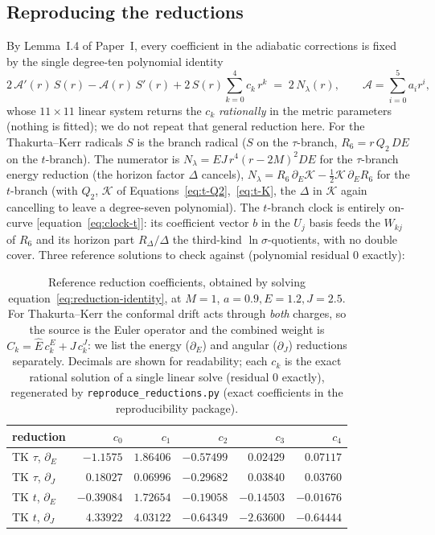 \documentclass[12pt]{iopart}
\theoremstyle{plain}
\theoremstyle{definition}
\theoremstyle{remark}
\newcommand{\Ehat}{\hat E}
\begin{document}
\subsection{Reproducing the reductions}
\label{app:reproduce}
By Lemma~I.4 of Paper~I, every coefficient in the adiabatic corrections is fixed by the
single degree-ten polynomial identity
\begin{equation}
    2\,\mathcal{A}'(r)\,S(r)-\mathcal{A}(r)\,S'(r)
    +2\,S(r)\sum_{k=0}^4 c_k\,r^k \;=\; 2\,N_\lambda(r),
    \qquad \mathcal{A}=\sum_{i=0}^5 a_i r^i,
    \label{eq:reduction-identity}
\end{equation}
whose $11\times11$ linear system returns the $c_k$ \emph{rationally} in the metric
parameters (nothing is fitted); we do not repeat that general reduction here. For the
Thakurta--Kerr radicals $S$ is the branch radical ($S$ on the $\tau$-branch,
$R_6=r\,Q_2\,DE$ on the $t$-branch). The
numerator is $N_\lambda=EJ\,r^4(r-2M)^2 DE$ for the $\tau$-branch energy reduction
(the horizon factor $\Delta$ cancels), $N_\lambda=R_6\,\partial_E\mathcal K
-\tfrac12\mathcal K\,\partial_E R_6$ for the $t$-branch (with $Q_2$, $\mathcal K$ of
Equations~\eqref{eq:t-Q2},~\eqref{eq:t-K}, the $\Delta$ in $\mathcal K$ again cancelling to
leave a degree-seven polynomial). The $t$-branch clock is entirely on-curve
[equation~\eqref{eq:clock-t}]: its coefficient vector $b$ in the $U_j$ basis feeds the $W_{kj}$ of $R_6$ and
its horizon part $R_\Delta/\Delta$ the third-kind $\ln\sigma$-quotients, with no
double cover. Three reference solutions to check against (polynomial residual $0$
exactly):
\begin{table}[htbp]
    \centering
    \caption{Reference reduction coefficients, obtained by solving
    equation~\eqref{eq:reduction-identity}, at $M{=}1$, $a{=}0.9,E{=}1.2,J{=}2.5$. For
    Thakurta--Kerr the conformal drift acts through \emph{both} charges, so the source
    is the Euler operator and the combined weight is $C_k=\Ehat\,c_k^{E}+J\,c_k^{J}$:
    we list the energy ($\partial_E$) and angular ($\partial_J$) reductions separately.
    Decimals are shown for readability; each $c_k$ is the
    exact rational solution of a single linear solve (residual $0$ exactly), regenerated
    by \texttt{reproduce\_reductions.py} (exact coefficients in the reproducibility
    package).}
    \label{tab:reduction-ck}
    \small
    \begin{tabular}{lrrrrr}
        \hline\hline
        reduction & $c_0$ & $c_1$ & $c_2$ & $c_3$ & $c_4$\\
        \hline
        TK $\tau$, $\partial_E$ & $-1.1575$ & $1.86406$ & $-0.57499$ & $0.02429$ & $0.07117$\\
        TK $\tau$, $\partial_J$ & $0.18027$ & $0.06996$ & $-0.29682$ & $0.03840$ & $0.03760$\\
        TK $t$, $\partial_E$ & $-0.39084$ & $1.72654$ & $-0.19058$ & $-0.14503$ & $-0.01676$\\
        TK $t$, $\partial_J$ & $4.33922$ & $4.03122$ & $-0.64349$ & $-2.63600$ & $-0.64444$\\
        \hline\hline
    \end{tabular}
\end{table}
\end{document}
